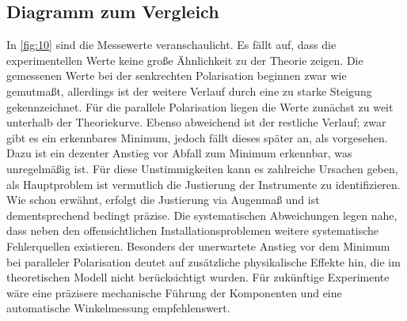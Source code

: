 \subsection{Diagramm zum Vergleich}
In \autoref{fig:10} sind die Messewerte veranschaulicht. Es fällt auf, dass 
die experimentellen Werte keine große Ähnlichkeit zu der Theorie zeigen. Die 
gemessenen Werte bei der senkrechten Polarisation beginnen zwar wie gemutmaßt, 
allerdings ist der weitere Verlauf durch eine zu starke Steigung gekennzeichnet. 
Für die parallele Polarisation liegen die Werte zunächst zu weit unterhalb der 
Theoriekurve. Ebenso abweichend ist der restliche Verlauf; zwar gibt es ein 
erkennbares Minimum, jedoch fällt dieses später an, als vorgesehen. Dazu ist 
ein dezenter Anstieg vor Abfall zum Minimum erkennbar, was unregelmäßig ist. 
Für diese Unstimmigkeiten kann es zahlreiche Ursachen geben, als Hauptproblem 
ist vermutlich die Justierung der Instrumente zu identifizieren. Wie schon 
erwähnt, erfolgt die Justierung via Augenmaß und ist dementsprechend bedingt 
präzise. Die systematischen Abweichungen legen nahe, dass neben den 
offensichtlichen Installationsproblemen weitere systematische Fehlerquellen 
existieren. Besonders der unerwartete Anstieg vor dem Minimum bei paralleler
Polarisation deutet auf zusätzliche physikalische Effekte hin, die im 
theoretischen Modell nicht berücksichtigt wurden. Für zukünftige Experimente
wäre eine präzisere mechanische Führung der Komponenten und eine automatische
Winkelmessung empfehlenswert.